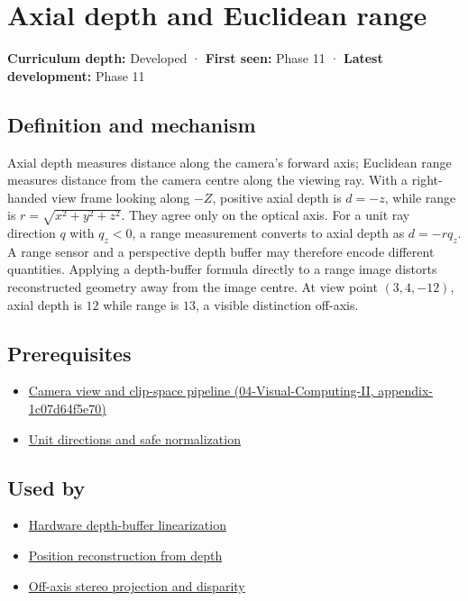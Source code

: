 \hypertarget{appendix-cac01ebeeb11}{}
\section{Axial depth and Euclidean range}\label{appendix-cac01ebeeb11-axial-depth-and-euclidean-range}

\textbf{Curriculum depth:} Developed · \textbf{First seen:} Phase 11 · \textbf{Latest development:} Phase 11

\subsection{Definition and mechanism}\label{appendix-cac01ebeeb11-definition-and-mechanism}

Axial depth measures distance along the camera's forward axis; Euclidean range measures distance from the camera centre along the viewing ray. With a right-handed view frame looking along \(-Z\), positive axial depth is \(d=-z\), while range is \(r=\sqrt{x^2+y^2+z^2}\). They agree only on the optical axis. For a unit ray direction \(q\) with \(q_z<0\), a range measurement converts to axial depth as \(d=-rq_z\). A range sensor and a perspective depth buffer may therefore encode different quantities. Applying a depth-buffer formula directly to a range image distorts reconstructed geometry away from the image centre. At view point \((3,4,-12)\), axial depth is \(12\) while range is \(13\), a visible distinction off-axis.

\subsection{Prerequisites}\label{appendix-cac01ebeeb11-prerequisites}

\begin{itemize}
\tightlist
\item
  \href{../04-Visual-Computing-II/main.pdf\#nameddest=appendix-1c07d64f5e70}{Camera view and clip-space pipeline (04-Visual-Computing-II, appendix-1c07d64f5e70)}
\item
  \hyperref[appendix-f744e41b95b4]{Unit directions and safe normalization}
\end{itemize}

\subsection{Used by}\label{appendix-cac01ebeeb11-used-by}

\begin{itemize}
\tightlist
\item
  \hyperref[appendix-1bc40b08db4a]{Hardware depth-buffer linearization}
\item
  \hyperref[appendix-2cbf2968e866]{Position reconstruction from depth}
\item
  \hyperref[appendix-0976e86e5b9f]{Off-axis stereo projection and disparity}
\end{itemize}

